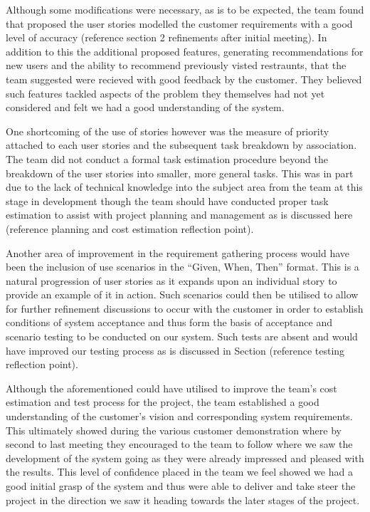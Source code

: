 \documentclass{l3proj}
\begin{document}
Although some modifications were necessary, as is to be expected, the team found that proposed the user stories modelled the customer requirements with a good level of accuracy (reference section 2 refinements after initial meeting). In addition to this the additional proposed features, generating recommendations for new users and the ability to recommend previously visted restraunts, that the team suggested were recieved with good feedback by the customer. They believed such features tackled aspects of the problem they themselves had not yet considered and felt we had a good understanding of the system. 

One shortcoming of the use of stories however was the measure of priority attached to each user stories and the subsequent task breakdown by association. The team did not conduct a formal task estimation procedure beyond the breakdown of the user stories into smaller, more general tasks. This was in part due to the lack of technical knowledge into the subject area from the team at this stage in development though the team should have conducted proper task estimation to assist with project planning and management as is discussed here (reference planning and cost estimation reflection point). 

Another area of improvement in the requirement gathering process would have been the inclusion of use scenarios in the “Given, When, Then” format. This is a natural progression of user stories as it expands upon an individual story to provide an example of it in action. Such scenarios could then be utilised to allow for further refinement discussions to occur with the customer in order to establish conditions of system acceptance and thus form the basis of acceptance and scenario testing to be conducted on our system. Such tests are absent and would have improved our testing process as is discussed in Section (reference testing reflection point).  

Although the aforementioned could have utilised to improve the team's cost estimation and test process for the project, the team established a good understanding of the customer's vision and corresponding system requirements. This ultimately showed during the various customer demonstration where by second to last meeting they encouraged to the team to follow where we saw the development of the system going as they were already impressed and pleased with the results. This level of confidence placed in the team we feel showed we had a good initial grasp of the system and thus were able to deliver and take steer the project in the direction we saw it heading towards the later stages of the project. 
\end{document}
